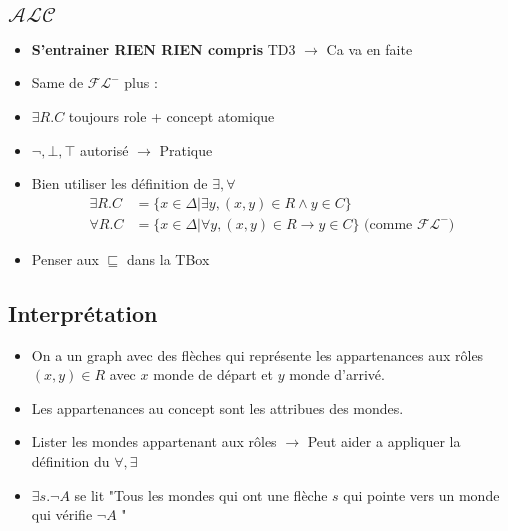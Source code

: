 \documentclass{article}
\theoremstyle{plain}%
\theoremstyle{definition}
\theoremstyle{remark}
\begin{document}
\subsection{$ \mathcal{ALC} $ }
\begin{itemize}
    \item \textbf{S'entrainer RIEN RIEN compris} TD3 $\rightarrow$ Ca va en faite
    \item Same de $ \mathcal{FL}^- $ plus : 
    \item $ \exists R.C $ toujours role + concept atomique 
    \item $ \neg , \bot , \top  $ autorisé $\rightarrow$ Pratique
    \item Bien utiliser les définition de $ \exists , \forall  $ \begin{align*}
        \exists R.C &= \{x \in \Delta | \exists y, (x,y) \in R \wedge y \in C\} \\
        \forall R.C &= \{x \in \Delta | \forall y, (x,y) \in R \to y \in C\} \text{ (comme } \mathcal{FL}^- \text{)}
    \end{align*}
    \item Penser aux $ \sqsubseteq  $ dans la TBox 
\end{itemize}

\subsection{Interprétation}
\begin{itemize}
    \item On a un graph avec des flèches qui représente les appartenances aux rôles $ (x,y) \in R $ avec $ x $ monde de départ et $ y $ monde d'arrivé.
    \item Les appartenances au concept sont les attribues des mondes.
    \item Lister les mondes appartenant aux rôles $\rightarrow$ Peut aider a appliquer la définition du $ \forall, \exists $
    \item $ \exists s. \neg A $ se lit "Tous les mondes qui ont une flèche $ s $ qui pointe vers un monde qui vérifie $ \neg A $ "
\end{itemize}
\end{document}
